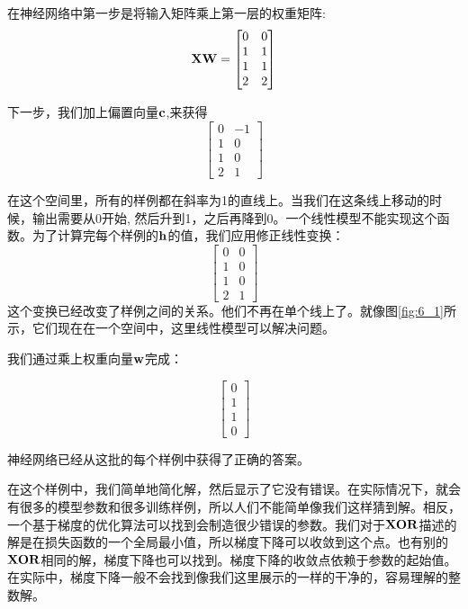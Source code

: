 在神经网络中第一步是将输入矩阵乘上第一层的权重矩阵:
\begin{equation}
\bf{X} \bf{W}=\begin{bmatrix}
0 & 0\\
1 & 1\\
1 & 1\\
2 & 2
\end{bmatrix}
\end{equation}

下一步，我们加上偏置向量$\bf{c}$,来获得
\begin{equation}
\begin{bmatrix}
0 & -1\\
1 & 0\\
1 & 0\\
2 & 1
\end{bmatrix}
\end{equation}

在这个空间里，所有的样例都在斜率为1的直线上。当我们在这条线上移动的时候，输出需要从0开始, 然后升到1，之后再降到0。一个线性模型不能实现这个函数。为了计算完每个样例的$\bf{h}$的值，我们应用修正线性变换：
\begin{equation}
\begin{bmatrix}
0 & 0\\
1 & 0\\
1 & 0\\
2 & 1
\end{bmatrix}
\end{equation}
这个变换已经改变了样例之间的关系。他们不再在单个线上了。就像图\ref{fig:6_1}所示，它们现在在一个空间中，这里线性模型可以解决问题。

我们通过乘上权重向量$\bf{w}$完成：

\begin{equation}
\begin{bmatrix}
0 \\
1 \\
1 \\
0
\end{bmatrix}
\end{equation}

神经网络已经从这批的每个样例中获得了正确的答案。

在这个样例中，我们简单地简化解，然后显示了它没有错误。在实际情况下，就会有很多的模型参数和很多训练样例，所以人们不能简单像我们这样猜到解。相反，一个基于梯度的优化算法可以找到会制造很少错误的参数。我们对于$\bf{XOR}$描述的解是在损失函数的一个全局最小值，所以梯度下降可以收敛到这个点。也有别的$\bf{XOR}$相同的解，梯度下降也可以找到。梯度下降的收敛点依赖于参数的起始值。在实际中，梯度下降一般不会找到像我们这里展示的一样的干净的，容易理解的整数解。

